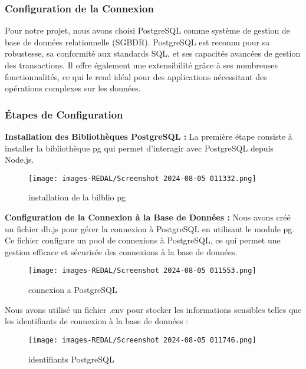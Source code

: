 \subsubsection{Configuration de la Connexion}
Pour notre projet, nous avons choisi PostgreSQL comme système de gestion de base de données relationnelle (SGBDR). PostgreSQL est reconnu pour sa robustesse, sa conformité aux standards SQL, et ses capacités avancées de gestion des transactions. Il offre également une extensibilité grâce à ses nombreuses fonctionnalités, ce qui le rend idéal pour des applications nécessitant des opérations complexes sur les données.

\subsubsection{Étapes de Configuration}
\textbf{Installation des Bibliothèques PostgreSQL :}
La première étape consiste à installer la bibliothèque pg qui permet d'interagir avec PostgreSQL depuis Node.js.

\begin{figure}[H]
\begin{center}
\texttt{[image: images-REDAL/Screenshot 2024-08-05 011332.png]}
\end{center}
\caption{installation de la bilblio pg}
\end{figure}



\textbf{Configuration de la Connexion à la Base de Données :}
Nous avons créé un fichier db.js pour gérer la connexion à PostgreSQL en utilisant le module pg. Ce fichier configure un pool de connexions à PostgreSQL, ce qui permet une gestion efficace et sécurisée des connexions à la base de données.

\begin{figure}[H]
\begin{center}
\texttt{[image: images-REDAL/Screenshot 2024-08-05 011553.png]}
\end{center}
\caption{connexion a PostgreSQL}
\end{figure}

\newpage
Nous avons utilisé un fichier .env pour stocker les informations sensibles telles que les identifiants de connexion à la base de données :

\begin{figure}[H]
\begin{center}
\texttt{[image: images-REDAL/Screenshot 2024-08-05 011746.png]}
\end{center}
\caption{identifiants PostgreSQL}
\end{figure}

